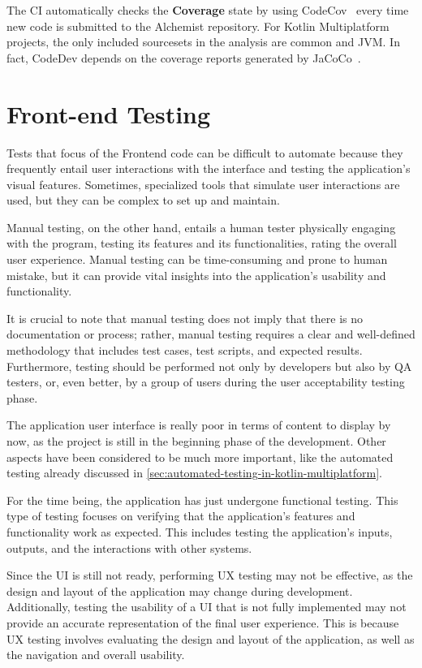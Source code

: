 The CI automatically checks the \textbf{Coverage} state by using CodeCov~\cite{CodecovT78:online} every time new code is submitted to the Alchemist repository. For Kotlin Multiplatform projects, the only included sourcesets in the analysis are common and JVM. In fact, CodeDev depends on the coverage reports generated by JaCoCo~\cite{EclEmmaJ37:online}.

\section{Front-end Testing}
\label{sec:front-end-testing}
Tests that focus of the Frontend code can be difficult to automate because they frequently entail user interactions with the interface and testing the application's visual features. Sometimes, specialized tools that simulate user interactions are used, but they can be complex to set up and maintain.\newline

Manual testing, on the other hand, entails a human tester physically engaging with the program, testing its features and its functionalities, rating the overall user experience. Manual testing can be time-consuming and prone to human mistake, but it can provide vital insights into the application's usability and functionality.\newline

It is crucial to note that manual testing does not imply that there is no documentation or process; rather, manual testing requires a clear and well-defined methodology that includes test cases, test scripts, and expected results. Furthermore, testing should be performed not only by developers but also by QA testers, or, even better, by a group of users during the user acceptability testing phase.\newline

The application user interface is really poor in terms of content to display by now, as the project is still in the beginning phase of the development. Other aspects have been considered to be much more important, like the automated testing already discussed in \ref{sec:automated-testing-in-kotlin-multiplatform}.\newline

For the time being, the application has just undergone functional testing. This type of testing focuses on verifying that the application's features and functionality work as expected. This includes testing the application's inputs, outputs, and the interactions with other systems.\newline

Since the UI is still not ready, performing UX testing may not be effective, as the design and layout of the application may change during development. Additionally, testing the usability of a UI that is not fully implemented may not provide an accurate representation of the final user experience. This is because UX testing involves evaluating the design and layout of the application, as well as the navigation and overall usability.
